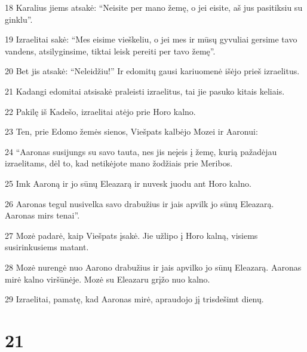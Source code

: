 \par 18 Karalius jiems atsakė: “Neisite per mano žemę, o jei eisite, aš jus pasitiksiu su ginklu”. 
\par 19 Izraelitai sakė: “Mes eisime vieškeliu, o jei mes ir mūsų gyvuliai gersime tavo vandens, atsilyginsime, tiktai leisk pereiti per tavo žemę”. 
\par 20 Bet jis atsakė: “Neleidžiu!” Ir edomitų gausi kariuomenė išėjo prieš izraelitus. 
\par 21 Kadangi edomitai atsisakė praleisti izraelitus, tai jie pasuko kitais keliais. 
\par 22 Pakilę iš Kadešo, izraelitai atėjo prie Horo kalno. 
\par 23 Ten, prie Edomo žemės sienos, Viešpats kalbėjo Mozei ir Aaronui: 
\par 24 “Aaronas susijungs su savo tauta, nes jis neįeis į žemę, kurią pažadėjau izraelitams, dėl to, kad netikėjote mano žodžiais prie Meribos. 
\par 25 Imk Aaroną ir jo sūnų Eleazarą ir nuvesk juodu ant Horo kalno. 
\par 26 Aaronas tegul nusivelka savo drabužius ir jais apvilk jo sūnų Eleazarą. Aaronas mirs tenai”. 
\par 27 Mozė padarė, kaip Viešpats įsakė. Jie užlipo į Horo kalną, visiems susirinkusiems matant. 
\par 28 Mozė nurengė nuo Aarono drabužius ir jais apvilko jo sūnų Eleazarą. Aaronas mirė kalno viršūnėje. Mozė su Eleazaru grįžo nuo kalno. 
\par 29 Izraelitai, pamatę, kad Aaronas mirė, apraudojo jį trisdešimt dienų.



\chapter{21}

